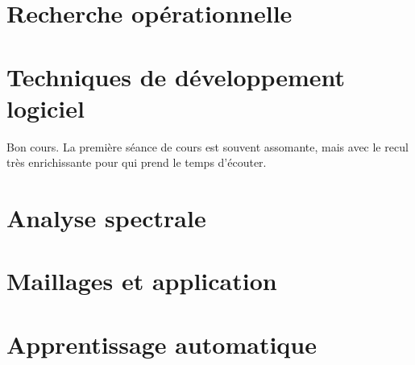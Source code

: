 \documentclass{report}
\begin{document}
\section{Recherche opérationnelle}

\section{Techniques de développement logiciel}

Bon cours. La première séance de cours est souvent assomante, mais avec le recul très enrichissante pour qui prend le temps d'écouter.

\section{Analyse spectrale}

\section{Maillages et application}

\section{Apprentissage automatique}
\end{document}
